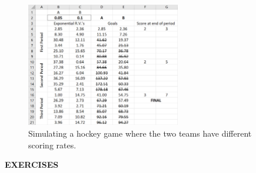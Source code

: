 \begin{figure}[htbp]
	\centering
	\includegraphics[width=0.6\textwidth]{fig/4_hockey2.png}
	\caption{Simulating a hockey game where the two teams have different scoring rates. \label{fig:4_hockey2}}
\end{figure}


\newpage
\begin{center}
	\textbf{EXERCISES}
\end{center}

